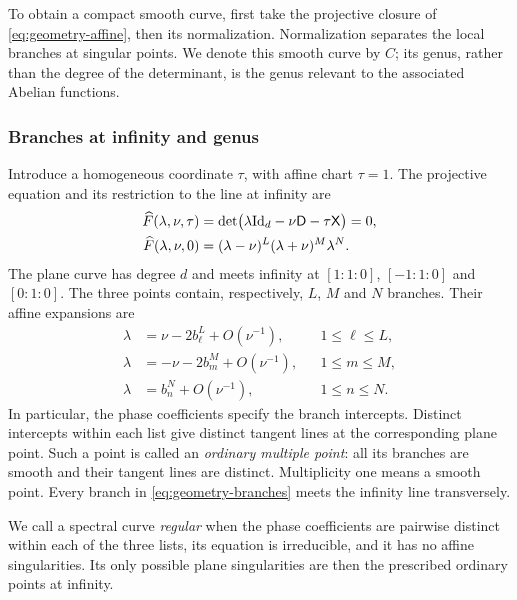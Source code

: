 To obtain a compact smooth curve, first take the projective closure
of \cref{eq:geometry-affine}, then its normalization. Normalization
separates the local branches at singular points. We denote this smooth
curve by $C$; its genus, rather than the degree of the determinant,
is the genus relevant to the associated Abelian functions.

\subsubsection{Branches at infinity and genus}

Introduce a homogeneous coordinate $\tau$, with affine chart $\tau=1$.
The projective equation and its restriction to the line at infinity are
\begin{align}
 \widehat F(\lambda,\nu,\tau)
 &=\det\bigl(\lambda\mathrm{Id}_d-\nu\mathsf D-\tau\mathsf X\bigr)=0,
 \label{eq:geometry-projective}\\
 \widehat F(\lambda,\nu,0)
 &=(\lambda-\nu)^L(\lambda+\nu)^M\lambda^N.
 \label{eq:geometry-infinity}
\end{align}
The plane curve has degree $d$ and meets infinity at
$[1:1:0]$, $[-1:1:0]$ and $[0:1:0]$. The three points contain,
respectively, $L$, $M$ and $N$ branches. Their affine expansions are
\begin{equation}\label{eq:geometry-branches}
\begin{aligned}
 \lambda&=\nu-2b_\ell^L+O(\nu^{-1}),&&1\leq\ell\leq L,\\
 \lambda&=-\nu-2b_m^M+O(\nu^{-1}),&&1\leq m\leq M,\\
 \lambda&=b_n^N+O(\nu^{-1}),&&1\leq n\leq N.
\end{aligned}
\end{equation}
In particular, the phase coefficients specify the branch intercepts.
Distinct intercepts within each list give distinct tangent lines at
the corresponding plane point. Such a point is called an
\emph{ordinary multiple point}: all its branches are smooth and
their tangent lines are distinct. Multiplicity one means a smooth
point. Every branch in \cref{eq:geometry-branches} meets the infinity
line transversely.

We call a spectral curve \emph{regular} when the phase coefficients
are pairwise distinct within each of the three lists, its equation is
irreducible, and it has no affine singularities. Its only possible
plane singularities are then the prescribed ordinary points at infinity.

